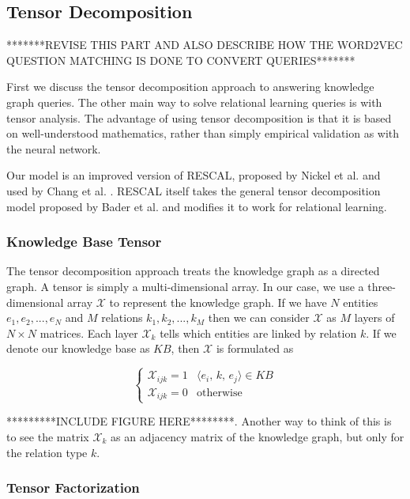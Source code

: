 \documentclass[pageno]{jpaper}
\begin{document}
\subsection{Tensor Decomposition}
\label{Tensor Decomposition}

*******REVISE THIS PART AND ALSO DESCRIBE HOW THE WORD2VEC QUESTION MATCHING
IS DONE TO CONVERT QUERIES*******

First we discuss the tensor decomposition approach to answering knowledge graph
queries. The other main way to solve relational learning queries is with tensor
analysis.  The advantage of using tensor decomposition is that it is based on
well-understood mathematics, rather than simply empirical validation as with the
neural network.

Our model is an improved version of RESCAL, proposed by Nickel et al.
\cite{Nickel2011} and used by Chang et al. \cite{Chang2014}. RESCAL itself takes
the general tensor decomposition model proposed by Bader et al. \cite{Bader2007}
and modifies it to work for relational learning. \\

\subsubsection{Knowledge Base Tensor}
\label{Knowledge Base Tensor}

The tensor decomposition approach treats the knowledge graph as a directed
graph. A tensor is simply a multi-dimensional array. In our case, we use a
three-dimensional array $\mathcal{X}$ to represent the knowledge graph. If we
have $N$ entities $e_1, e_2, ..., e_N$ and $M$ relations $k_1, k_2, ..., k_M$
then we can consider $\mathcal{X}$ as $M$ layers of $N\times N$ matrices. Each layer
$\mathcal{X}_k$ tells which entities are linked by relation $k$. If we denote
our knowledge base as $KB$, then $\mathcal{X}$ is formulated as

$$
\begin{cases}
    \mathcal{X}_{ijk} = 1 & \langle e_i,\,k,\,e_j\rangle \in KB \\
    \mathcal{X}_{ijk} = 0 & \text{otherwise}
\end{cases}
$$

*********INCLUDE FIGURE HERE********. Another way
to think of this is to see the matrix $\mathcal{X}_k$ as an adjacency matrix
of the knowledge graph, but only for the relation type $k$. \\

\subsubsection{Tensor Factorization}
\label{Tensor Factorization}
\end{document}
